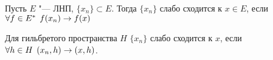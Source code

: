 \documentclass[main]{subfiles}
\begin{document}
\begin{definition}
  Пусть \( E \) "--- ЛНП, \( \{ x_n \} \subset E \). Тогда 
  \( \{ x_n \} \) слабо сходится к \( x \in E \), если
  \( \forall {f \in E^*} \; \, f(x_n) \to f(x) \)
\end{definition}
\begin{remark}
  Для гильбретого пространства \( H \) \( \{ x_n \} \)
  слабо сходится к \( x \), если \( \forall {h \in H} \; \,
  (x_n, h) \to (x, h) \).
\end{remark}

  
\end{document}
